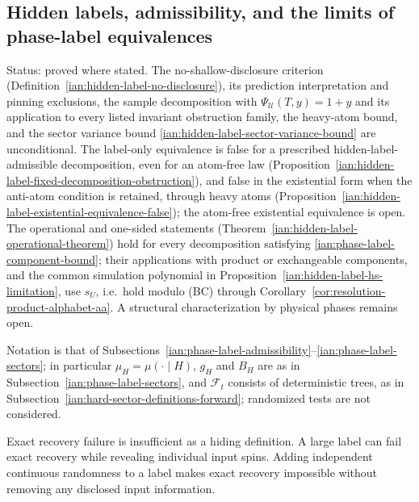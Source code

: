 \subsection{Hidden labels, admissibility, and the limits of phase-label equivalences}
\label{ian:hidden-label-admissibility}

Status: proved where stated. The no-shallow-disclosure criterion (Definition~\ref{ian:hidden-label-no-disclosure}), its prediction interpretation and pinning exclusions, the sample decomposition with \(\Psi_{\mathcal U}(T,y)=1+y\) and its application to every listed invariant obstruction family, the heavy-atom bound, and the sector variance bound \eqref{ian:hidden-label-sector-variance-bound} are unconditional. The label-only equivalence is false for a prescribed hidden-label-admissible decomposition, even for an atom-free law (Proposition~\ref{ian:hidden-label-fixed-decomposition-obstruction}), and false in the existential form when the anti-atom condition is retained, through heavy atoms (Proposition~\ref{ian:hidden-label-existential-equivalence-false}); the atom-free existential equivalence is open. The operational and one-sided statements (Theorem~\ref{ian:hidden-label-operational-theorem}) hold for every decomposition satisfying \eqref{ian:phase-label-component-bound}; their applications with product or exchangeable components, and the common simulation polynomial in Proposition~\ref{ian:hidden-label-hs-limitation}, use \(s_U\), i.e.\ hold modulo (BC) through Corollary~\ref{cor:resolution-product-alphabet-aa}. A structural characterization by physical phases remains open.

Notation is that of Subsections~\ref{ian:phase-label-admissibility}--\ref{ian:phase-label-sectors}; in particular \(\mu_H=\mu(\cdot\mid H)\), \(g_H\) and \(B_H\) are as in Subsection~\ref{ian:phase-label-sectors}, and \(\mathcal F_t\) consists of deterministic trees, as in Subsection~\ref{ian:hard-sector-definitions-forward}; randomized tests are not considered.

Exact recovery failure is insufficient as a hiding definition. A large label can fail exact recovery while revealing individual input spins. Adding independent continuous randomness to a label makes exact recovery impossible without removing any disclosed input information.

